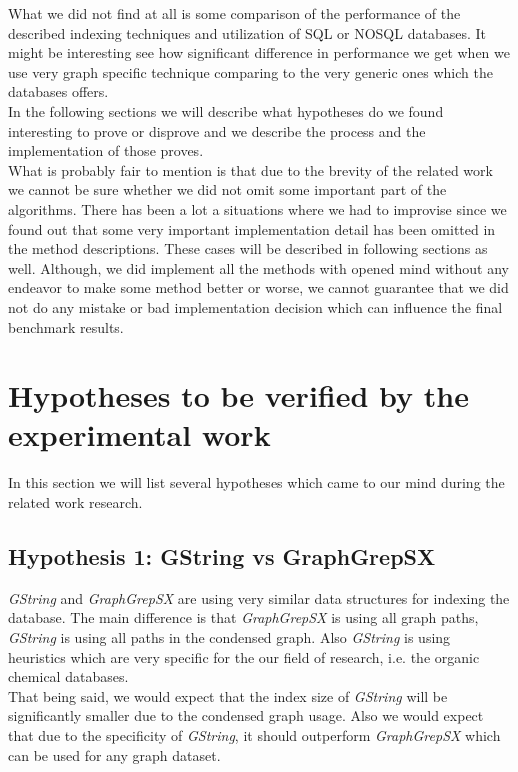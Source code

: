 What we did not find at all is some comparison of the performance of the described indexing techniques and utilization of SQL or NOSQL databases. It might be interesting see how significant difference in performance we get when we use very graph specific technique comparing to the very generic ones which the databases offers.\\

In the following sections we will describe what hypotheses do we found interesting to prove or disprove and we describe the process and the implementation of those proves.\\

What is probably fair to mention is that due to the brevity of the related work we cannot be sure whether we did not omit some important part of the algorithms. There has been a lot a situations where we had to improvise since we found out that some very important implementation detail has been omitted in the method descriptions. These cases will be described in following sections as well. Although, we did implement all the methods with opened mind without any endeavor to make some method better or worse, we cannot guarantee that we did not do any mistake or bad implementation decision which can influence the final benchmark results.

\section{Hypotheses to be verified by the experimental work}

In this section we will list several hypotheses which came to our mind during the related work research.

\subsection{Hypothesis 1: GString vs GraphGrepSX}

\textit{GString} and \textit{GraphGrepSX} are using very similar data structures for indexing the database. The main difference is that \textit{GraphGrepSX} is using all graph paths, \textit{GString} is using all paths in the condensed graph. Also \textit{GString} is using heuristics which are very specific for the our field of research, i.e. the organic chemical databases.\\

That being said, we would expect that the index size of \textit{GString} will be significantly smaller due to the condensed graph usage. Also we would expect that due to the specificity of \textit{GString}, it should outperform \textit{GraphGrepSX} which can be used for any graph dataset.

